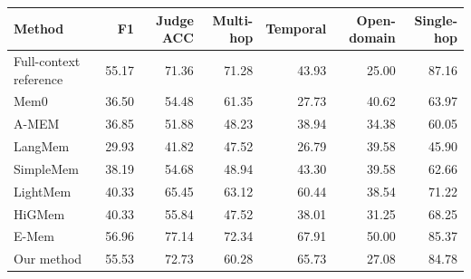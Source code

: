 \begin{tabular}{lrrrrrr}
\toprule
Method & F1 & Judge ACC & Multi-hop & Temporal & Open-domain & Single-hop \\
\midrule
Full-context reference & 55.17 & 71.36 & 71.28 & 43.93 & 25.00 & 87.16 \\
Mem0 & 36.50 & 54.48 & 61.35 & 27.73 & 40.62 & 63.97 \\
A-MEM & 36.85 & 51.88 & 48.23 & 38.94 & 34.38 & 60.05 \\
LangMem & 29.93 & 41.82 & 47.52 & 26.79 & 39.58 & 45.90 \\
SimpleMem & 38.19 & 54.68 & 48.94 & 43.30 & 39.58 & 62.66 \\
LightMem & 40.33 & 65.45 & 63.12 & 60.44 & 38.54 & 71.22 \\
HiGMem & 40.33 & 55.84 & 47.52 & 38.01 & 31.25 & 68.25 \\
E-Mem & 56.96 & 77.14 & 72.34 & 67.91 & 50.00 & 85.37 \\
Our method & 55.53 & 72.73 & 60.28 & 65.73 & 27.08 & 84.78 \\
\bottomrule
\end{tabular}
